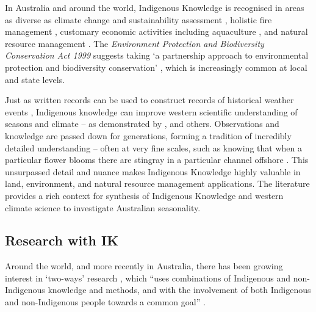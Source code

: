 In Australia and around the world, Indigenous Knowledge is recognised
in areas as diverse as climate change and sustainability assessment
\citep[eg.][]{cochran2015}, holistic fire management \citep[eg.][]{clarke2009,price2012},
customary economic activities including aquaculture \citep{woodward2012a}, and
natural resource management \citep[eg.][]{prober2011}.  The \textit{Environment
Protection and Biodiversity Conservation Act 1999} suggests taking `a
partnership approach to environmental protection and biodiversity conservation'
\citep{ens2012}, which is increasingly common at local and state levels.


Just as written records can be used to construct records of historical weather
events \citep[eg.][]{rodrigo1999}, Indigenous knowledge can improve western
scientific understanding of seasons and climate -- as demonstrated by
\citet{green2010a,clarke2009}, and others.
%
Observations and knowledge are passed down for generations, forming a
tradition of incredibly detailed understanding -- often at very fine scales,
such as knowing that when a particular flower blooms there are stingray in
a particular channel offshore \citep{barber2005}.
%
This unsurpassed detail and nuance makes Indigenous Knowledge highly valuable
in land, environment, and natural resource management applications.
The literature provides a rich context for synthesis of Indigenous Knowledge
and western climate science to investigate Australian seasonality.




\subsection{Research with IK}


%
%


Around the world, and more recently in Australia, there has been growing
interest in `two-ways' research \citep{turner2009,prober2011},
which ``uses combinations of Indigenous and non-Indigenous knowledge and
methods, and with the involvement of both Indigenous and non-Indigenous people
towards a common goal'' \citep{ens2014}.

